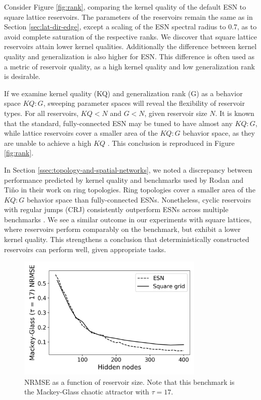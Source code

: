 Consider Figure \ref{fig:rank}, comparing the kernel quality of the default ESN
to square lattice reservoirs. The parameters of the reservoirs remain the same
as in Section \ref{sec:lat-dir-edge}, except a scaling of the ESN spectral
radius to 0.7, as to avoid complete saturation of the respective ranks. We
discover that square lattice reservoirs attain lower kernel
qualities. Additionally the difference between kernel quality and generalization
is also higher for ESN. This difference is often used as a metric of reservoir
quality, as a high kernel quality and low generalization rank is desirable.

If we examine kernel quality (KQ) and generalization rank (G) as a behavior
space $KQ:G$, sweeping parameter spaces will reveal the flexibility of reservoir
types. For all reservoirs, $KQ < N$ and $G < N$, given reservoir size $N$. It is
known that the standard, fully-connected ESN may be tuned to have almost any
$KQ:G$, while lattice reservoirs cover a smaller area of the $KQ:G$ behavior
space, as they are unable to achieve a high $KQ$
\cite{mcquillan_role_2019}. This conclusion is reproduced in Figure
\ref{fig:rank}.

In Section \ref{ssec:topology-and-spatial-networks}, we noted a discrepancy
between performance predicted by kernel quality and benchmarks used by Rodan and
Tiňo in their work on ring topologies. Ring topologies cover a smaller area of
the $KQ:G$ behavior space than fully-connected ESNs. Nonetheless, cyclic
reservoirs with regular jumps (CRJ) consistently outperform ESNs across multiple
benchmarks \cite{rodan_simple_2012}. We see a similar outcome in our experiments
with square lattices, where reservoirs perform comparably on the benchmark, but
exhibit a lower kernel quality. This strengthens a conclusion that
deterministically constructed reservoirs can perform well, given appropriate
tasks.

\begin{figure}[t]
  \centering
  \includegraphics[width=3.5in]{figures/mg17.png}
  \caption{
    NRMSE as a function of reservoir size. Note that this benchmark is the
Mackey-Glass chaotic attractor with $\tau = 17$.
  }
  \label{fig:mg17}
\end{figure}

